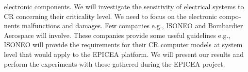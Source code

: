 \begin{otherlanguage}{english}
electronic   components.   We   will   investigate   the   sensitivity   of   electrical   systems   to   CR   concerning   their  
criticality   level.   We   need   to   focus   on   the   electronic   components   malfunctions   and   damages.   Few  
companies   e.g.,   ISONEO   and   Bombardier   Aerospace   will   involve.   These   companies   provide   some  
useful   guidelines   e.g.,   ISONEO   will   provide   the   requirements   for   their   CR   computer   models   at   system level   that   would   apply   to   the   EPICEA   platform.   We   will   present   our   results   and   perform   the  
experiments with those gathered during the EPICEA project. 
\end{otherlanguage}

